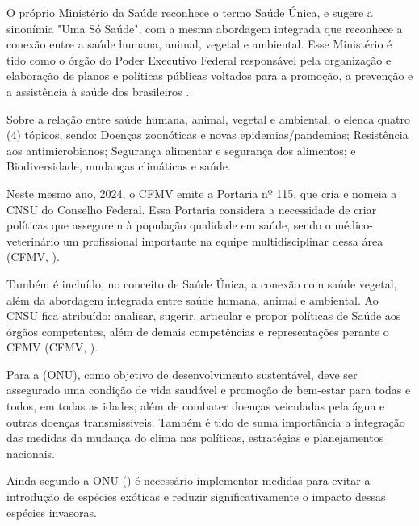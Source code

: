 \indent O próprio Ministério da Saúde reconhece o termo Saúde Única, e sugere a sinonímia "Uma Só Saúde", com a mesma abordagem integrada que reconhece a conexão entre a saúde humana, animal, vegetal e ambiental. Esse Ministério é tido como o órgão do Poder Executivo Federal responsável pela organização e elaboração de planos e políticas públicas voltados para a promoção, a prevenção e a assistência à saúde dos brasileiros \cite{MinisterioSaudeS1}.

\indent Sobre a relação entre saúde humana, animal, vegetal e ambiental, o  elenca quatro (4) tópicos, sendo: Doenças zoonóticas e novas epidemias/pandemias; Resistência aos antimicrobianos; Segurança alimentar e segurança dos alimentos; e Biodiversidade, mudanças climáticas e saúde.




\indent Neste mesmo ano, 2024, o \acrshort{CFMV} emite a Portaria nº 115, que cria e nomeia a \acrfull{CNSU} do Conselho Federal. Essa Portaria considera  a necessidade de criar políticas que assegurem à população qualidade em saúde, sendo o médico-veterinário um  profissional importante na equipe multidisciplinar dessa área (\acrlong{CFMV}, \citeyear{CFMV2024PORTARIA}).

\indent Também é incluído, no conceito de Saúde Única, a conexão com saúde vegetal, além da abordagem integrada entre saúde humana, animal e ambiental. Ao \acrshort{CNSU} fica atribuído: analisar, sugerir, articular e propor políticas de Saúde aos órgãos competentes, além de demais competências e representações perante o \acrshort{CFMV} (\acrlong{CFMV}, \citeyear{CFMV2024PORTARIA}).

\indent Para a  (\acrshort{ONU}), como objetivo de desenvolvimento sustentável, deve ser assegurado uma condição de vida saudável e promoção de bem-estar para todas e todos, em todas as idades; além de combater doenças veiculadas pela água e outras doenças transmissíveis. Também é tido de suma importância a integração das medidas da mudança do clima nas políticas, estratégias e planejamentos nacionais.

\indent Ainda segundo a \acrshort{ONU} (\citeyear{ONUODS22}) é necessário implementar medidas para evitar a introdução de espécies exóticas e reduzir significativamente o impacto dessas espécies invasoras.

